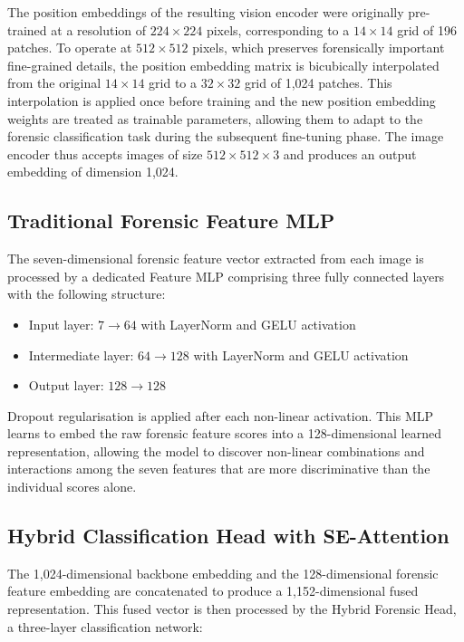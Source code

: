 The position embeddings of the resulting vision encoder were originally pre-trained at a resolution of $224 \times 224$ pixels, corresponding to a $14 \times 14$ grid of 196 patches. To operate at $512 \times 512$ pixels, which preserves forensically important fine-grained details, the position embedding matrix is bicubically interpolated from the original $14 \times 14$ grid to a $32 \times 32$ grid of 1,024 patches. This interpolation is applied once before training and the new position embedding weights are treated as trainable parameters, allowing them to adapt to the forensic classification task during the subsequent fine-tuning phase. The image encoder thus accepts images of size $512 \times 512 \times 3$ and produces an output embedding of dimension 1,024.

\subsection{Traditional Forensic Feature MLP}

The seven-dimensional forensic feature vector extracted from each image is processed by a dedicated Feature MLP comprising three fully connected layers with the following structure:
\begin{itemize}
    \item Input layer: $7 \rightarrow 64$ with LayerNorm and GELU activation
    \item Intermediate layer: $64 \rightarrow 128$ with LayerNorm and GELU activation
    \item Output layer: $128 \rightarrow 128$
\end{itemize}
Dropout regularisation is applied after each non-linear activation. This MLP learns to embed the raw forensic feature scores into a 128-dimensional learned representation, allowing the model to discover non-linear combinations and interactions among the seven features that are more discriminative than the individual scores alone.

\subsection{Hybrid Classification Head with SE-Attention}

The 1,024-dimensional backbone embedding and the 128-dimensional forensic feature embedding are concatenated to produce a 1,152-dimensional fused representation. This fused vector is then processed by the Hybrid Forensic Head, a three-layer classification network:

